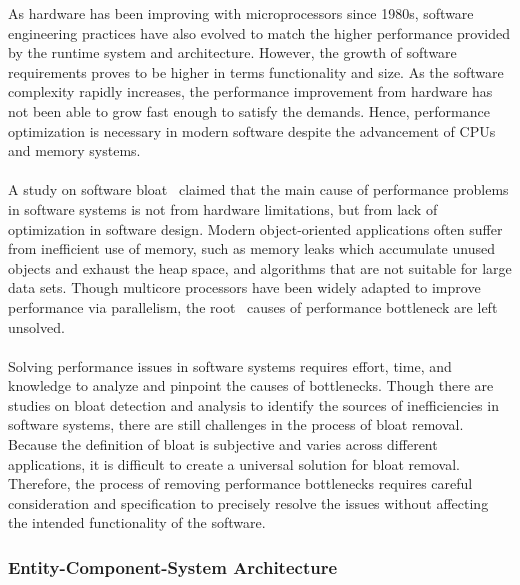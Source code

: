 As hardware has been improving with microprocessors since 1980s, software engineering practices have 
also evolved to match the higher performance provided by the runtime system and architecture.
However, the growth of software requirements proves to be higher in terms functionality and size.
As the software complexity rapidly increases, the performance improvement from hardware has not been 
able to grow fast enough to satisfy the demands.
Hence, performance optimization is necessary in modern software despite the advancement of CPUs and 
memory systems.
\\\\
A study on software bloat~\cite{Software_Bloat_Analysis} claimed that the main cause of performance 
problems in software systems is not from hardware limitations, but from lack of optimization in software design.
Modern object-oriented applications often suffer from inefficient use of memory, such as memory leaks 
which accumulate unused objects and exhaust the heap space, and algorithms that are not suitable for 
large data sets.
Though multicore processors have been widely adapted to improve performance via parallelism, the root \
causes of performance bottleneck are left unsolved.
\\\\
Solving performance issues in software systems requires effort, time, and knowledge to analyze and 
pinpoint the causes of bottlenecks.
Though there are studies on bloat detection and analysis to identify the sources of inefficiencies 
in software systems, there are still challenges in the process of bloat removal.
Because the definition of bloat is subjective and varies across different applications, it is difficult 
to create a universal solution for bloat removal.
Therefore, the process of removing performance bottlenecks requires careful consideration and specification 
to precisely resolve the issues without affecting the intended functionality of the software.

\subsubsection*{Entity-Component-System Architecture}

